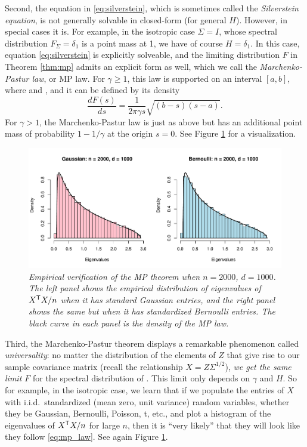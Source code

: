 \documentclass{article}
\begin{document}
Second, the equation in \eqref{eq:silverstein}, which is sometimes called the
\emph{Silverstein equation}, is not generally solvable in closed-form (for
general $H$). However, in special cases it is. For example, in the isotropic
case $\Sigma = I$, whose spectral distribution $F_\Sigma = \delta_1$ is a point
mass at 1, we have of course $H = \delta_1$. In this case, equation
\eqref{eq:silverstein} is explicitly solveable, and the limiting distribution
$F$ in Theorem \ref{thm:mp} admits an explicit form as well, which we call the
\emph{Marchenko-Pastur law}, or MP law. For $\gamma \geq 1$, this law is 
supported on an interval $[a,b]$, where  and
, and it can be defined by its density     
\begin{equation}
\label{eq:mp_law}
\frac{dF(s)}{ds} = \frac{1}{2 \pi \gamma s} \sqrt{(b-s)(s-a)}.
\end{equation}
For $\gamma > 1$, the Marchenko-Pastur law is just as above but has an
additional point mass of probability $1-1/\gamma$ at the origin $s=0$. See
Figure \ref{fig:mp} for a visualization.

\begin{figure}[htb]
\centering
\includegraphics[width=\textwidth]{rmt.pdf}
\caption{\it Empirical verification of the MP theorem when $n=2000$,
  $d=1000$. The left panel shows the empirical distribution of eigenvalues of
  $X^{\mathsf{T}} X/n$ when it has standard Gaussian entries, and the right panel shows 
  the same but when it has standardized Bernoulli entries. The black curve in
  each panel is the density of the MP law.}    
\label{fig:mp}
\end{figure}

Third, the Marchenko-Pastur theorem displays a remarkable phenomenon called
\emph{universality}: no matter the distribution of the elements of $Z$ that give
rise to our sample covariance matrix  (recall the
relationship $X = Z \Sigma^{1/2}$), \emph{we get the same limit $F$} for the
spectral distribution of \smash{$\hSigma$}. This limit only depends on $\gamma$
and $H$. So for example, in the isotropic case, we learn that if we populate the
entries of $X$ with i.i.d.\ standardized (mean zero, unit variance) random
variables, whether they be Gaussian, Bernoulli, Poisson, t, etc., and plot a
histogram of the eigenvalues of $X^{\mathsf{T}} X/n$ for large $n$, then it is ``very
likely'' that they will look like they follow \eqref{eq:mp_law}. See again
Figure \ref{fig:mp}.  
\end{document}
